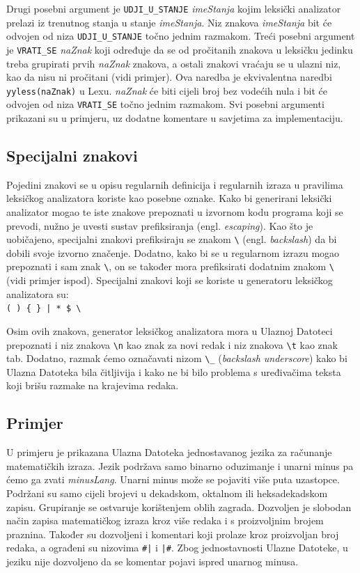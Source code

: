 \documentclass[times, 12pt, utf8]{book}
\begin{document}
Drugi posebni argument je \verb|UDJI_U_STANJE| \emph{imeStanja} kojim leksički analizator prelazi iz trenutnog stanja u stanje \emph{imeStanja}.
Niz znakova \emph{imeStanja} bit će odvojen od niza \verb|UDJI_U_STANJE| točno jednim razmakom.
Treći posebni argument je \verb|VRATI_SE| \emph{naZnak} koji određuje da se od pročitanih znakova u leksičku jedinku treba grupirati prvih \emph{naZnak} znakova, a ostali znakovi vraćaju se u ulazni niz, kao da nisu ni pročitani (vidi primjer).
Ova naredba je ekvivalentna naredbi \verb|yyless(naZnak)| u Lexu.
\emph{naZnak} će biti cijeli broj bez vodećih nula i bit će odvojen od niza \verb|VRATI_SE| točno jednim razmakom.
Svi posebni argumenti prikazani su u primjeru, uz dodatne komentare u savjetima za implementaciju.

\subsection{Specijalni znakovi}\label{sec:specijalni_znakovi}
Pojedini znakovi se u opisu regularnih definicija i regularnih izraza u pravilima leksičkog analizatora koriste kao posebne oznake.
Kako bi generirani leksički analizator mogao te iste znakove prepoznati u izvornom kodu programa koji se prevodi, nužno je uvesti sustav prefiksiranja (engl. \emph{escaping}).
Kao što je uobičajeno, specijalni znakovi prefiksiraju se znakom \verb|\| (engl. \emph{backslash}) da bi dobili svoje izvorno značenje.
Dodatno, kako bi se u regularnom izrazu mogao prepoznati i sam znak \verb|\|, on se također mora prefiksirati dodatnim znakom \verb|\| (vidi primjer ispod).
Specijalni znakovi koji se koriste u generatoru leksičkog analizatora su:\\
\verb=( ) { } | * $ \=

Osim ovih znakova, generator leksičkog analizatora mora u Ulaznoj Datoteci prepoznati i niz znakova \verb|\n| kao znak za novi redak i niz znakova \verb|\t| kao znak tab.
Dodatno, razmak ćemo označavati nizom \verb|\_| (\emph{backslash underscore}) kako bi Ulazna Datoteka bila čitljivija i kako ne bi bilo problema s uređivačima teksta koji brišu razmake na krajevima redaka.

\subsection{Primjer}\label{sec:generator_primjer}
U primjeru je prikazana Ulazna Datoteka jednostavanog jezika za računanje matematičkih izraza.
Jezik podržava samo binarno oduzimanje i unarni minus pa ćemo ga zvati \emph{minusLang}.
Unarni minus može se pojaviti više puta uzastopce.
Podržani su samo cijeli brojevi u dekadskom, oktalnom ili heksadekadskom zapisu.
Grupiranje se ostvaruje korištenjem oblih zagrada.
Dozvoljen je slobodan način zapisa matematičkog izraza kroz više redaka i s proizvoljnim brojem praznina.
Također su dozvoljeni i komentari koji prolaze kroz proizvoljan broj redaka, a ograđeni su nizovima \verb=#|= i \verb=|#=.
Zbog jednostavnosti Ulazne Datoteke, u jeziku nije dozvoljeno da se komentar pojavi ispred unarnog minusa.
\end{document}
